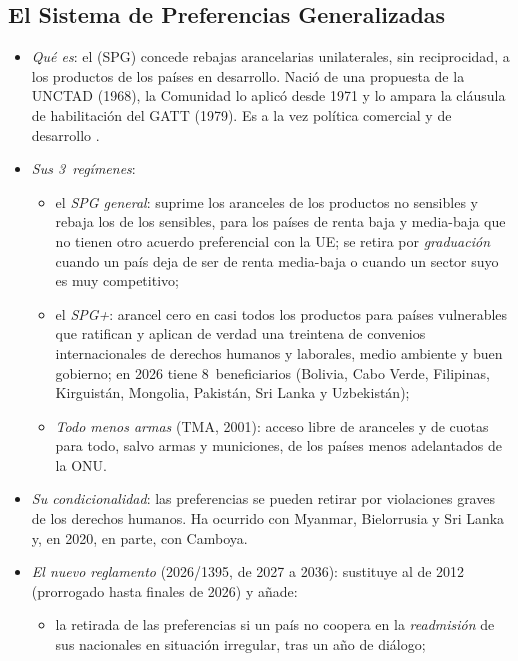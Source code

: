 \documentclass[11pt]{article}
\begin{document}
\subsection{El Sistema de Preferencias Generalizadas}\label{sec:spg}

\begin{itemize}
\item \emph{Qué es}: el  (SPG) concede rebajas arancelarias unilaterales, sin reciprocidad, a los productos de los países en desarrollo. Nació de una propuesta de la UNCTAD (1968), la Comunidad lo aplicó desde 1971 y lo ampara la cláusula de habilitación del GATT (1979). Es a la vez política comercial y de desarrollo .
\item \emph{Sus 3~regímenes}:
  \begin{itemize}
  \item el \emph{SPG general}: suprime los aranceles de los productos no sensibles y rebaja los de los sensibles, para los países de renta baja y media-baja que no tienen otro acuerdo preferencial con la UE; se retira por \emph{graduación} cuando un país deja de ser de renta media-baja o cuando un sector suyo es muy competitivo;
  \item el \emph{SPG+}: arancel cero en casi todos los productos para países vulnerables que ratifican y aplican de verdad una treintena de convenios internacionales de derechos humanos y laborales, medio ambiente y buen gobierno; en 2026 tiene 8~beneficiarios (Bolivia, Cabo Verde, Filipinas, Kirguistán, Mongolia, Pakistán, Sri Lanka y Uzbekistán)\nocite{CE2026SPGPagina};
  \item \emph{Todo menos armas} (TMA, 2001): acceso libre de aranceles y de cuotas para todo, salvo armas y municiones, de los países menos adelantados de la ONU.
  \end{itemize}
\item \emph{Su condicionalidad}: las preferencias se pueden retirar por violaciones graves de los derechos humanos. Ha ocurrido con Myanmar, Bielorrusia y Sri Lanka y, en 2020, en parte, con Camboya.
\item \emph{El nuevo reglamento} (2026/1395, de 2027 a 2036)\nocite{UE2026SPG}: sustituye al de 2012 (prorrogado hasta finales de 2026) y añade:
  \begin{itemize}
  \item la retirada de las preferencias si un país no coopera en la \emph{readmisión} de sus nacionales en situación irregular, tras un año de diálogo;

\end{itemize}
\end{itemize}
\end{document}
